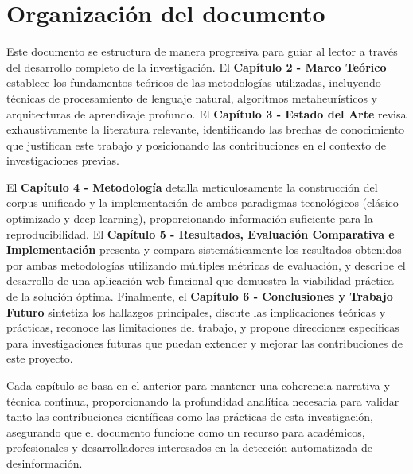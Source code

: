 \section{Organización del documento}

Este documento se estructura de manera progresiva para guiar al lector a través del desarrollo completo de la investigación. El \textbf{Capítulo 2 - Marco Teórico} establece los fundamentos teóricos de las metodologías utilizadas, incluyendo técnicas de procesamiento de lenguaje natural, algoritmos metaheurísticos y arquitecturas de aprendizaje profundo. El \textbf{Capítulo 3 - Estado del Arte} revisa exhaustivamente la literatura relevante, identificando las brechas de conocimiento que justifican este trabajo y posicionando las contribuciones en el contexto de investigaciones previas.

El \textbf{Capítulo 4 - Metodología} detalla meticulosamente la construcción del corpus unificado y la implementación de ambos paradigmas tecnológicos (clásico optimizado y deep learning), proporcionando información suficiente para la reproducibilidad. El \textbf{Capítulo 5 - Resultados, Evaluación Comparativa e Implementación} presenta y compara sistemáticamente los resultados obtenidos por ambas metodologías utilizando múltiples métricas de evaluación, y describe el desarrollo de una aplicación web funcional que demuestra la viabilidad práctica de la solución óptima. Finalmente, el \textbf{Capítulo 6 - Conclusiones y Trabajo Futuro} sintetiza los hallazgos principales, discute las implicaciones teóricas y prácticas, reconoce las limitaciones del trabajo, y propone direcciones específicas para investigaciones futuras que puedan extender y mejorar las contribuciones de este proyecto.

Cada capítulo se basa en el anterior para mantener una coherencia narrativa y técnica continua, proporcionando la profundidad analítica necesaria para validar tanto las contribuciones científicas como las prácticas de esta investigación, asegurando que el documento funcione como un recurso para académicos, profesionales y desarrolladores interesados en la detección automatizada de desinformación.
